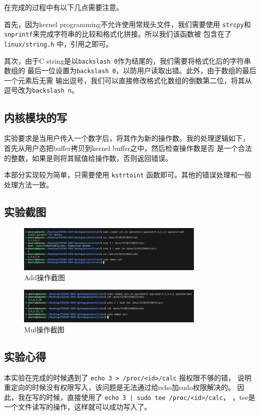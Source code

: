 在完成的过程中有以下几点需要注意。

首先，因为kernel programming不允许使用常规头文件，我们需要使用 \texttt{strcpy}和
\texttt{snprintf}来完成字符串的比较和格式化拼接。所以我们该函数被
包含在了 \texttt{linux/string.h} 中，引用之即可。

其次，由于C string是以\texttt{backslash 0}作为结尾的，我们需要将格式化后的字符串数组的
最后一位设置为\texttt{backslash 0}，以防用户读取出错。此外，由于数组的最后一个元素后无需
输出逗号，我们可以直接修改格式化数组的倒数第二位，将其从逗号改为\texttt{backslash n}。

\subsection{内核模块的写}
实验要求是当用户传入一个数字后，将其作为新的操作数。我的处理逻辑如下，
首先从用户态把buffer拷贝到kernel buffer之中，然后检查操作数是否
是一个合法的整数，如果是则将其赋值给操作数，否则返回错误。

本部分实现较为简单，只需要使用 \texttt{kstrtoint} 函数即可。其他的错误处理和一般
处理方法一致。

\subsection{实验截图}

\begin{figure}[!h]
	\centering
	\includegraphics[width=0.8\textwidth]{../fig/add.png}
	\caption{Add操作截图}
\end{figure}

\begin{figure}[!h]
	\centering
	\includegraphics[width=0.8\textwidth]{../fig/mul.png}
	\caption{Mul操作截图}
\end{figure}

\subsection{实验心得}
本实验在完成的时候遇到了 \texttt{echo 3 > /proc/<id>/calc} 报权限不够的错，
说明重定向的时候没有权限写入，该问题是无法通过给echo加sudo权限解决的。
因此，我在写的时候，直接使用了 \texttt{echo 3 | sudo tee /proc/<id>/calc}，
，tee是一个文件读写的操作，这样就可以成功写入了。


